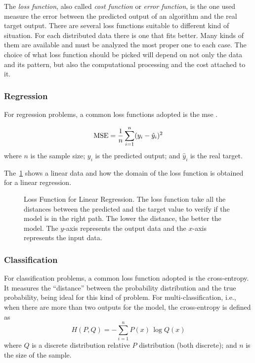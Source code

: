 The \emph{loss function}, also called \emph{cost function} or \emph{error function}, is the one used measure the error between the predicted output of an algorithm and the real target output. 
There are several loss functions suitable to different kind of situation. 
For each distributed data there is one that fits better.
Many kinds of them are available and must be analyzed the most proper one to each case. 
The choice of what loss function should be picked will depend on not only the data and its pattern, but also the computational processing and the cost attached to it.

\subsubsection*{Regression}

For regression problems, a common loss functions adopted is the \gls*{mse} \citep{bussab2017}. 

\begin{equation}
    \text{MSE} = \frac{1}{n} \sum_{i=1}^n (y_i - \hat{y}_i)^2
    \label{eq:mse}
\end{equation}
%
where \(n\) is the sample size; \(y_i\) is the predicted output; and \(\hat{y}_i\) is the real target.

The~\cref{fig:mae_chart} shows a linear data and how the domain of the loss function is obtained for a linear regression.
%
\begin{figure}[!htb]
    \centering
    
    \caption[Loss Function for Linear Regression]{Loss Function for Linear Regression. The loss function take all the distances between the predicted and the target value to verify if the model is in the right path. The lower the distance, the better the model. The \(y\)-axis represents the output data and the \(x\)-axis represents the input data.}
    \label{fig:mae_chart}
\end{figure}

\subsubsection*{Classification}

For classification problems, a common loss function adopted is the cross-entropy.
It measures the ``distance'' between the probability distribution and the true probability, being ideal for this kind of problem.
For multi-classification, i.e., when there are more than two outputs for the model, the cross-entropy is defined as
%
\begin{equation}
    H(P,Q) = - \sum_{i=1}^n P(x) \, \log Q(x)
    \label{eq:cross_entropy}
\end{equation}
%
where \(Q\) is a discrete distribution relative \(P\) distribution (both discrete); and \(n\) is the size of the sample.

